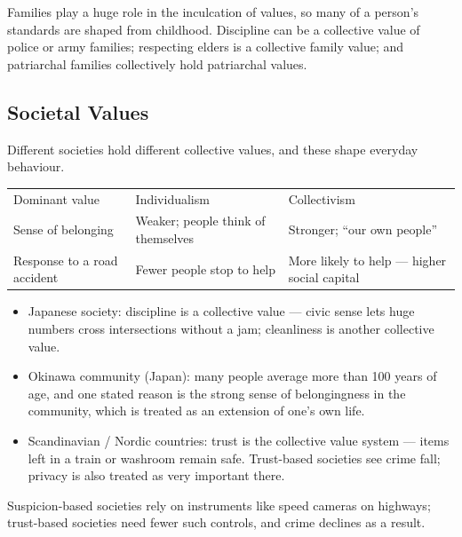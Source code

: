 Families play a huge role in the inculcation of values, so many of a person's standards are shaped from childhood. Discipline can be a collective value of police or army families; respecting elders is a collective family value; and patriarchal families collectively hold patriarchal values.

\subsection{Societal Values}

Different societies hold different collective values, and these shape everyday behaviour.

\begin{center}
\begin{tabularx}{\textwidth}{>{\raggedright\arraybackslash}p{3.4cm} Y Y}
 &  &  \\
\toprule
Dominant value & Individualism & Collectivism \\
Sense of belonging & Weaker; people think of themselves & Stronger; ``our own people'' \\
Response to a road accident & Fewer people stop to help & More likely to help --- higher social capital \\
\bottomrule
\end{tabularx}
\end{center}

\begin{ExampleBox}
\begin{itemize}
\item Japanese society: discipline is a collective value --- civic sense lets huge numbers cross intersections without a jam; cleanliness is another collective value.
\item Okinawa community (Japan): many people average more than 100 years of age, and one stated reason is the strong sense of belongingness in the community, which is treated as an extension of one's own life.
\item Scandinavian / Nordic countries: trust is the collective value system --- items left in a train or washroom remain safe. Trust-based societies see crime fall; privacy is also treated as very important there.
\end{itemize}
\end{ExampleBox}

\begin{CriticalPoint}
Suspicion-based societies rely on instruments like speed cameras on highways; trust-based societies need fewer such controls, and crime declines as a result.
\end{CriticalPoint}


